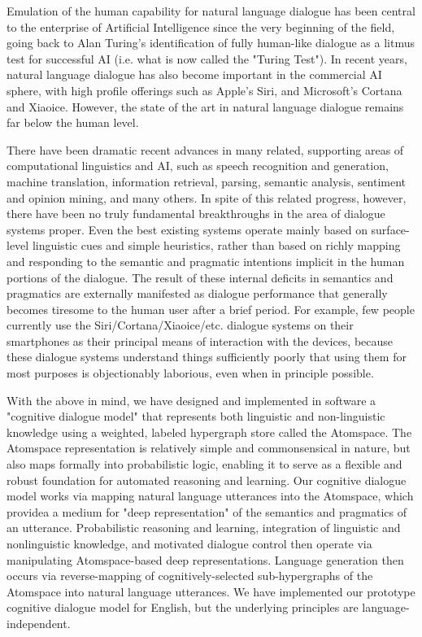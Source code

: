 \begin{englishabstract}

Emulation of the human capability for natural language dialogue has been central to the enterprise of Artificial Intelligence since the very beginning of the field, going back to Alan Turing's identification of fully human-like dialogue as a litmus test for successful AI (i.e. what is now called the "Turing Test").  In recent years, natural language dialogue has also become important in the commercial AI sphere, with high profile offerings such as Apple's Siri, and Microsoft's Cortana and Xiaoice.  However, the state of the art in natural language dialogue remains far below the human level.  

There have been dramatic recent advances in many related, supporting areas of computational linguistics and AI, such as speech recognition and generation, machine translation, information retrieval, parsing, semantic analysis, sentiment and opinion mining, and many others.  In spite of this related progress, however, there have been no truly fundamental breakthroughs in the area of dialogue systems proper.  Even the best existing systems operate mainly based on surface-level linguistic cues and simple heuristics, rather than based on richly mapping and responding to the semantic and pragmatic intentions implicit in the human portions of the dialogue.  The result of these internal deficits in semantics and pragmatics are externally manifested as dialogue performance that generally becomes tiresome to the human user after a brief period.  For example, few people currently use the Siri/Cortana/Xiaoice/etc. dialogue systems on their smartphones as their principal means of interaction with the devices, because these dialogue systems understand things sufficiently poorly that using them for most purposes is objectionably laborious, even when in principle possible.

With the above in mind, we have designed and implemented in software a "cognitive dialogue model" that represents both linguistic and non-linguistic knowledge using a weighted, labeled hypergraph store called the Atomspace.  The Atomspace representation is relatively simple and commonsensical in nature, but also maps formally into probabilistic logic, enabling it to serve as a flexible and robust foundation for automated reasoning and learning.  Our cognitive dialogue  model works via  mapping natural language utterances into the Atomspace, which providea a medium for "deep representation" of the semantics and pragmatics of an utterance.  Probabilistic reasoning and learning, integration of linguistic and nonlinguistic knowledge, and motivated dialogue control then operate via manipulating Atomspace-based deep representations.  Language generation then occurs via reverse-mapping of cognitively-selected sub-hypergraphs of the Atomspace into natural language utterances.  We have implemented our prototype cognitive dialogue model for English, but the underlying principles are language-independent.


\end{englishabstract}
